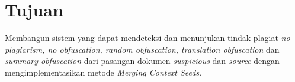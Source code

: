 \documentclass[../Book, Implementasi Algoritma Merging Context Seeds untuk Plagiarism Detection.tex]{subfiles}
\begin{document}
	\section{Tujuan}
		\noindent Membangun sistem yang dapat mendeteksi dan menunjukan tindak plagiat \textit{no plagiarism, no obfuscation, random obfuscation, translation obfuscation} dan \textit{summary obfuscation} dari pasangan dokumen \textit{suspicious} dan \textit{source} dengan mengimplementasikan metode \textit{Merging Context Seeds}.
\end{document}
